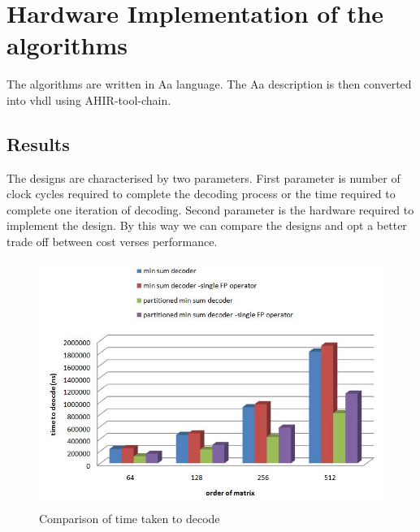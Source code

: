 
\chapter{ Hardware Implementation of the algorithms }

\label{Chapter8} 


The algorithms are written in Aa language. The Aa description is then converted into vhdl using AHIR-tool-chain.\cite{8}


\section{Results}
The designs are characterised by two parameters. First parameter is number of clock cycles required to complete the decoding process or the time required to complete one iteration of decoding. Second parameter is the hardware required to implement the design. By this way we can compare the designs and opt a better trade off between cost verses performance.


 \begin{figure}[h]
 \begin{center}
    \includegraphics[height=8cm,width=12cm]{result_time.jpg}
    \caption{Comparison of time taken to decode} 
    \label{result_time}
 \end{center}
\end{figure}


